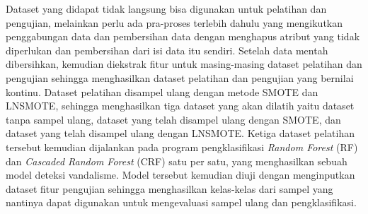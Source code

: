 Dataset yang didapat tidak langsung bisa digunakan untuk pelatihan dan
pengujian, melainkan perlu ada pra-proses terlebih dahulu yang mengikutkan
penggabungan data dan pembersihan data dengan menghapus atribut yang tidak
diperlukan dan pembersihan dari isi data itu sendiri.
Setelah data mentah dibersihkan, kemudian diekstrak fitur untuk masing-masing
dataset pelatihan dan pengujian sehingga menghasilkan dataset pelatihan dan
pengujian yang bernilai kontinu.
Dataset pelatihan disampel ulang dengan metode SMOTE dan LNSMOTE,
sehingga menghasilkan tiga dataset yang akan dilatih yaitu dataset tanpa sampel
ulang, dataset yang telah disampel ulang dengan SMOTE, dan dataset yang telah
disampel ulang dengan LNSMOTE.
Ketiga dataset pelatihan tersebut kemudian dijalankan pada program
pengklasifikasi \textit{Random Forest} (RF) dan \textit{Cascaded Random Forest}
(CRF) satu per satu, yang menghasilkan sebuah model deteksi vandalisme.
Model tersebut kemudian diuji dengan menginputkan dataset fitur pengujian
sehingga menghasilkan kelas-kelas dari sampel yang nantinya dapat digunakan
untuk mengevaluasi sampel ulang dan pengklasifikasi.
